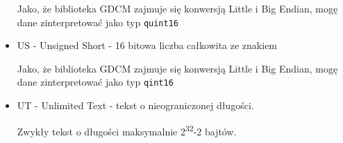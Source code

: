 \begin{itemize}
    Jako, że biblioteka GDCM zajmuje się konwersją Little i Big Endian, mogę dane zinterpretować jako typ \texttt{quint16}

    \item US - Unsigned Short - 16 bitowa liczba całkowita ze znakiem

    Jako, że biblioteka GDCM zajmuje się konwersją Little i Big Endian, mogę dane zinterpretować jako typ \texttt{qint16}
    
    \item UT - Unlimited Text - tekst o nieograniczonej długości.

    Zwykły tekst o długości maksymalnie 2\textsuperscript{32}-2 bajtów.
\end{itemize}